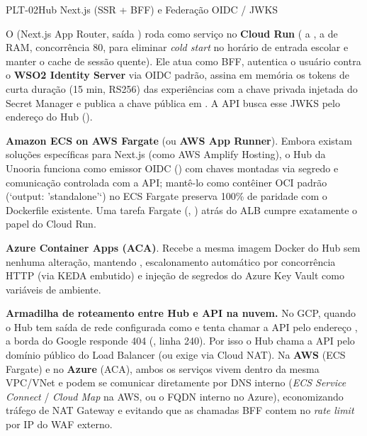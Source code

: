 \begin{pecaarq}{PLT-02}{Hub Next.js (SSR + BFF) e Federação OIDC / JWKS}{\sgcp~\nativo\enspace\saws~\equivalente\enspace\sazure~\nativo}
\begin{campos}
  \item[Como é hoje (GCP)] O  (Next.js App Router, saída
    ) roda como serviço no \textbf{Cloud Run} ( a ,  a  de RAM, concorrência 80, 
    para eliminar \emph{cold start} no horário de entrada escolar e manter o
    cache de sessão quente). Ele atua como BFF, autentica o usuário contra o
    \textbf{WSO2 Identity Server} via OIDC padrão, assina em memória os tokens
    de curta duração (15 min, RS256) das experiências com a chave privada injetada
    do Secret Manager e publica a chave pública em .
    A API busca esse JWKS pelo endereço do Hub ().
  \item[Equivalente AWS] \textbf{Amazon ECS on AWS Fargate} (ou \textbf{AWS App
    Runner}). Embora existam soluções específicas para Next.js (como AWS
    Amplify Hosting), o Hub da Unooria funciona como emissor OIDC ()
    com chaves montadas via segredo e comunicação controlada com a API; mantê-lo
    como contêiner OCI padrão (`output: 'standalone'`) no ECS Fargate preserva
    100\% de paridade com o Dockerfile existente. Uma tarefa Fargate (, ) atrás do ALB cumpre exatamente o
    papel do Cloud Run.
  \item[Equivalente Azure] \textbf{Azure Container Apps (ACA)}. Recebe a mesma
    imagem Docker do Hub sem nenhuma alteração, mantendo ,
    escalonamento automático por concorrência HTTP (via KEDA embutido) e injeção
    de segredos do Azure Key Vault como variáveis de ambiente.
\end{campos}
\end{pecaarq}

\begin{atencao}
\textbf{Armadilha de roteamento entre Hub e API na nuvem.} No GCP, quando o Hub
tem saída de rede configurada como  e tenta chamar a
API pelo endereço , a borda do Google responde 404 (,
linha 240). Por isso o Hub chama a API pelo domínio público do Load Balancer (ou
exige  via Cloud NAT). Na \textbf{AWS} (ECS Fargate) e no
\textbf{Azure} (ACA), ambos os serviços vivem dentro da mesma VPC/VNet e podem se
comunicar diretamente por DNS interno (\emph{ECS Service Connect} / \emph{Cloud
Map} na AWS, ou o FQDN interno  no
Azure), economizando tráfego de NAT Gateway e evitando que as chamadas BFF
contem no \emph{rate limit} por IP do WAF externo.
\end{atencao}


